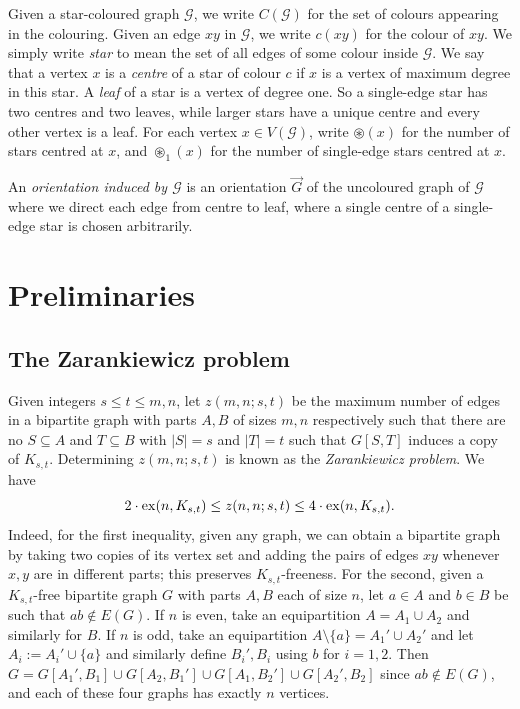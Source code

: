 \documentclass[a4paper, 12pt]{article}
\numberwithin{equation}{section}
\def\sm{{\setminus}}
\def\cen{\circledast}
\newcommand{\ova}[1]{\overrightarrow{#1}}
\newcommand{\ms}[1]{\mathscr{#1}}
\begin{document}
Given a star-coloured graph $\ms{G}$, we write $C(\ms{G})$ for the set of colours appearing in the colouring. Given an edge $xy$ in $\ms{G}$, we write $c(xy)$ for the colour of $xy$.
We simply write \emph{star} to mean the set of all edges of some colour inside $\ms{G}$. 
We say that a vertex $x$ is a \emph{centre} of a star of colour $c$ if $x$ is a vertex of maximum degree in this star. A \emph{leaf} of a star is a vertex of degree one.
So a single-edge star has two centres and two leaves, while larger stars have a unique centre and every other vertex is a leaf.  
For each vertex $x \in V(\ms{G})$, write $\cen(x)$ for the number of stars centred at $x$, and $\cen_1(x)$ for the number of single-edge stars centred at $x$.

An \emph{orientation induced by $\ms{G}$} is an orientation $\ova{G}$ of the uncoloured graph of $\ms{G}$ where we direct each edge from centre to leaf, where a single centre of a single-edge star is chosen arbitrarily.
 

\section{Preliminaries}\label{sec:prelim}

\subsection{The Zarankiewicz problem}\label{sec:zaran}


Given integers $s \leq t \leq m, n$, let $z(m,n;s,t)$ be the maximum number of edges in a bipartite graph with parts $A,B$ of sizes $m,n$ respectively such that there are no $S \subseteq A$ and $T \subseteq B$ with $|S|=s$ and $|T|=t$ such that $G[S,T]$ induces a copy of $K_{s,t}$.
Determining $z(m,n;s,t)$ is known as the \emph{Zarankiewicz problem}.
We have
\begin{equation}\label{eq:zex}
2\cdot {\rm ex}(n,K_{s,t}) \leq z(n,n;s,t) \leq 4 \cdot {\rm ex}(n,K_{s,t}).
\end{equation}
Indeed, for the first inequality, given any graph, we can obtain a bipartite graph by taking two copies of its vertex set and adding the pairs of edges $xy$ whenever $x,y$ are in different parts; this preserves $K_{s,t}$-freeness.
For the second, given a $K_{s,t}$-free bipartite graph $G$ with parts $A,B$ each of size $n$, let $a \in A$ and $b \in B$ be such that $ab \notin E(G)$. If $n$ is even, take an equipartition $A=A_1 \cup A_2$ and similarly for $B$. If $n$ is odd, take an equipartition $A\sm\{a\}=A_1' \cup A_2'$ and let $A_i:=A_i' \cup \{a\}$ and similarly define $B_i',B_i$ using $b$ for $i=1,2$. Then $G = G[A_1', B_1] \cup G[A_2, B_1'] \cup G[A_1, B_2'] \cup G[A_2', B_2]$ since $ab \notin E(G)$, and each of these four graphs has exactly $n$ vertices.
\end{document}
